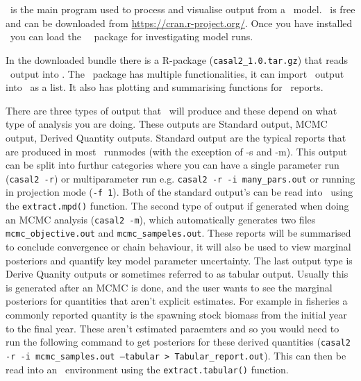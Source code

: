 \section{ \label{sec:post-processing}}

\R\ is the main program used to process and visualise output from a \CNAME\ model. \R\ is free and can be downloaded from \url{https://cran.r-project.org/}. Once you have installed \R\ you can load the \cname\ \R\ package for investigating model runs.

In the downloaded bundle there is a R-package (\texttt{casal2\_1.0.tar.gz}) that reads \CNAME\ output into \R. The \CNAME\ package has multiple functionalities, it can import \CNAME\ output into \R\ as a list. It also has plotting and summarising functions for \CNAME\ reports.

There are three types of output that \CNAME\ will produce and these depend on what type of analysis you are doing. These outputs are Standard output, MCMC output, Derived Quantity outputs. Standard output are the typical reports that are produced in most \CNAME\ runmodes (with the exception of -s and -m). This output can be split into furthur categories where you can have a single parameter run (\texttt{casal2 -r}) or multiparameter run e.g. \texttt{casal2 -r -i many\_pars.out} or running in projection mode (\texttt{-f 1}). Both of the standard output's can be read into \R\ using the \texttt{extract.mpd()} function. The second type of output if generated when doing an MCMC analysis (\texttt{casal2 -m}), which automatically generates two files \texttt{mcmc\_objective.out} and \texttt{mcmc\_sampeles.out}. These reports will be summarised to conclude convergence or chain behaviour, it will also be used to view marginal posteriors and quantify key model parameter uncertainty. The last output type is Derive Quanity outputs or sometimes referred to as tabular output. Usually this is generated after an MCMC is done, and the user wants to see the marginal posteriors for quantities that aren't explicit estimates. For example in fisheries a commonly reported quantity is the spawning stock biomass from the initial year to the final year. These aren't estimated paraemters and so you would need to run the following command to get posteriors for these derived quantities (\texttt{casal2 -r -i mcmc\_samples.out --tabular > Tabular\_report.out}). This can then be read into an \R\ environment using the \texttt{extract.tabular()} function.


